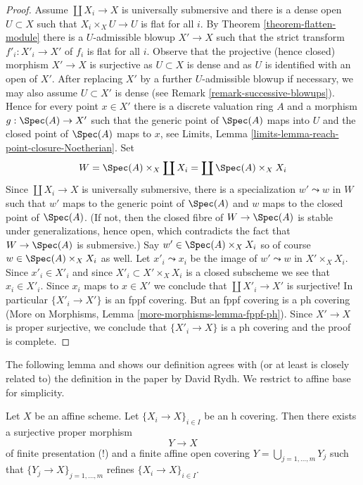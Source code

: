 \begin{proof}
\medskip\noindent
Assume $\coprod X_i \to X$ is universally submersive and
there is a dense open $U \subset X$ such that
$X_i \times_X U \to U$ is flat for all $i$.
By Theorem \ref{theorem-flatten-module}
there is a $U$-admissible blowup $X' \to X$ such that
the strict transform $f'_i : X'_i \to X'$ of $f_i$ is flat for all $i$.
Observe that the projective (hence closed) morphism $X' \to X$
is surjective as $U \subset X$ is dense and as $U$ is identified
with an open of $X'$. After replacing $X'$ by a further
$U$-admissible blowup if necessary, we may also assume $U \subset X'$ is dense
(see Remark \ref{remark-successive-blowups}).
Hence for every point $x \in X'$ there is a discrete valuation ring $A$
and a morphism $g : \Spec(A) \to X'$ such that the generic
point of $\Spec(A)$ maps into $U$ and the closed point of
$\Spec(A)$ maps to $x$, see Limits, Lemma
\ref{limits-lemma-reach-point-closure-Noetherian}.
Set
$$
W = \Spec(A) \times_X \coprod X_i = \coprod \Spec(A) \times_X X_i
$$
Since $\coprod X_i \to X$ is universally submersive,
there is a specialization $w' \leadsto w$ in $W$
such that $w'$ maps to the generic point of $\Spec(A)$
and $w$ maps to the closed point of $\Spec(A)$.
(If not, then the closed fibre of $W \to \Spec(A)$
is stable under generalizations, hence open, which
contradicts the fact that $W \to \Spec(A)$ is submersive.)
Say $w' \in \Spec(A) \times_X X_i$ so of course
$w \in \Spec(A) \times_X X_i$ as well. Let
$x'_i \leadsto x_i$ be the image of $w' \leadsto w$ in
$X' \times_X X_i$. Since $x'_i \in X'_i$ and since
$X'_i \subset X' \times_X X_i$ is a closed subscheme
we see that $x_i \in X'_i$. Since $x_i$ maps to $x \in X'$
we conclude that
$\coprod X'_i \to X'$ is surjective! In particular
$\{X'_i \to X'\}$ is an fppf covering. But an fppf covering is a ph covering
(More on Morphisms, Lemma \ref{more-morphisms-lemma-fppf-ph}).
Since $X' \to X$ is proper surjective, we conclude
that $\{X'_i \to X\}$ is a ph covering and the proof is complete.
\end{proof}

\noindent
The following lemma and \cite[Theorem 8.4]{rydh_descent}
shows our definition agrees with (or at least is
closely related to) the definition in the paper \cite{rydh_descent}
by David Rydh. We restrict to affine base for simplicity.

\begin{lemma}
\label{lemma-approximate-h-cover}
Let $X$ be an affine scheme. Let $\{X_i \to X\}_{i \in I}$
be an h covering. Then there exists a surjective proper morphism
$$
Y \longrightarrow X
$$
of finite presentation (!) and a finite affine open covering
$Y = \bigcup_{j = 1, \ldots, m} Y_j$ such that
$\{Y_j \to X\}_{j = 1, \ldots, m}$ refines $\{X_i \to X\}_{i \in I}$.
\end{lemma}

